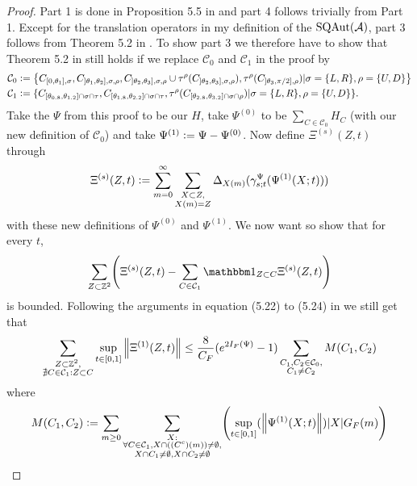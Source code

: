 \documentclass[12pt,a4paper,twoside]{article}
\numberwithin{equation}{section}
\begin{document}
\begin{proof}
	Part 1 is done in Proposition 5.5 in \cite{ogata2021h3gmathbb} and part 4 follows trivially from Part 1. Except for the translation operators in my definition of the $\textrm{SQAut}(\AA)$, part 3 follows from Theorem 5.2 in \cite{ogata2021h3gmathbb}. To show part 3 we therefore have to show that Theorem 5.2 in \cite{ogata2021h3gmathbb} still holds if we replace $\mathcal{C}_0$ and $\mathcal{C}_1$ in the proof by
	\begin{align}
		\mathcal{C}_0&\defeq \left\{C_{[0,\theta_1],\sigma},C_{]\theta_1,\theta_2],\sigma,\rho},C_{]\theta_2,\theta_3],\sigma,\rho}\cup\tau^{\rho}(C_{]\theta_2,\theta_3],\sigma,\rho}),\tau^\rho(C_{]\theta_3,\pi/2],\rho})|\sigma=\{L,R\},\rho=\{U,D\}\right\}\\
		\mathcal{C}_1&\defeq\{C_{[\theta_{0.8},\theta_{1.2}]\cap\sigma\cap\tau},C_{[\theta_{1.8},\theta_{2.2}]\cap\sigma\cap\tau},\tau^\rho(C_{[\theta_{2.8},\theta_{3.2}]\cap\sigma\cap\rho})|\sigma=\{L,R\},\rho=\{U,D\}\}.
	\end{align}
	Take the $\Psi$ from this proof to be our $H$, take $\Psi^{(0)}$ to be $\sum_{C\in\mathcal{C}_0}H_{C}$ (with our new definition of $\mathcal{C}_0$) and take $\Psi^{(1)}\defeq \Psi-\Psi^{(0)}$. Now define $\Xi^{(s)}(Z,t)$ through
	\begin{equation}\label{eq:PropertiesLocallyGeneratedAutomorphismsProofDefinitionXi}
		\Xi^{(s)}(Z,t)\defeq\sum_{m=0}^\infty \sum_{\substack{X\subset Z,\\X(m)=Z}}\Delta_{X(m)}(\gamma^\Psi_{s;t}(\Psi^{(1)}(X;t)))
	\end{equation}
	with these new definitions of $\Psi^{(0)}$ and $\Psi^{(1)}$. We now want so show that for every $t$,
	\begin{equation}
		\sum_{Z\subset\ZZ^2}\left(\Xi^{(s)}(Z,t)-\sum_{C\in\mathcal{C}_1}\id_{Z\subset C}\Xi^{(s)}(Z,t)\right)
	\end{equation}
	is bounded. Following the arguments in equation (5.22) to (5.24) in \cite{ogata2021h3gmathbb} we still get that
	\begin{equation}
		\sum_{\substack{Z\subset\ZZ^2,\\\nexists C\in\mathcal{C}_1:Z\subset C}}\sup_{t\in[0,1]}\norm{\Xi^{(1)}(Z,t)}\leq \frac{8}{C_F}(e^{2I_F(\Psi)}-1)\sum_{\substack{C_1,C_2\in\mathcal{C}_0,\\ C_1\neq C_2}}M(C_1,C_2)
	\end{equation}
	where
	\begin{equation}
		M(C_1,C_2)\defeq \sum_{m\geq 0}\sum_{\substack{X:\\\forall C\in\mathcal{C}_1,X\cap((C^c)(m))\neq\emptyset,\\X\cap C_1\neq\emptyset,X\cap C_2\neq\emptyset}}\left(\sup_{t\in[0,1]}(\norm{\Psi^{(1)}(X;t)})\abs{X}G_F(m)\right)

\end{equation}
\end{proof}
\end{document}
